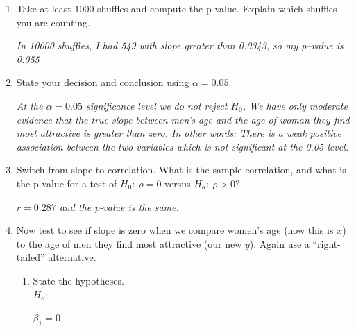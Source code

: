 \begin{enumerate}
\begin{key}
  {\it AWV.  generally flatter}
\end{key}

\item  Take at least 1000 shuffles and compute the p-value.  Explain
  which shuffles you are counting. 
\begin{students}
 \vspace{2cm}      
\end{students}

\begin{key}
  {\it In 10000 shuffles, I had 549 with slope greater than 0.0343, so
  my p--value is 0.055}
\end{key}

\item State your decision and conclusion using $\alpha = 0.05$.
\begin{students}
 \vspace{2cm}      
\end{students}

\begin{key}
  {\it At the $\alpha = 0.05$ significance level we do not reject
    $H_0$, We have only moderate evidence that the true slope between
    men's age and the age of woman they find most attractive is
    greater than zero.  In other words: There is a weak positive
    association between the two variables which is not significant at
    the 0.05 level.}
\end{key}

\item Switch from slope to correlation. What is the sample
  correlation, and what is the p-value for a test of $H_0:\ \rho=0$
  versus $H_a:\ \rho > 0$?.
\begin{students}
 \vspace{1cm}      
\end{students}

\begin{key}
{\it $r = 0.287$ and the p-value is the same.}
\end{key}

\item Now test to see if slope is zero when we compare women's age
  (now this is $x$) to the age of men they find most attractive (our
  new $y$). Again use a ``right-tailed'' alternative.  
  \begin{enumerate}
  \item State the hypotheses.\\
  $H_o:$
\begin{students}
 \vspace{1cm}      
\end{students}
\begin{key}
  {\it  $\beta_1 = 0$   }
\end{key}


\end{enumerate}
\end{enumerate}
